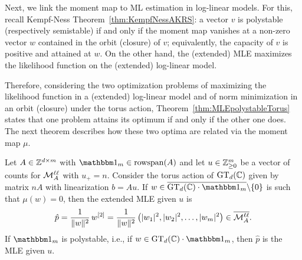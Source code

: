Next, we link the moment map to ML estimation in log-linear models. For this, recall Kempf-Ness Theorem~\ref{thm:KempfNessAKRS}: a vector $v$ is polystable (respectively semistable) if and only if the moment map vanishes at a non-zero vector $w$ contained in the orbit (closure) of $v$; equivalently, the capacity of $v$ is positive and attained at $w$. 
On the other hand, the (extended) MLE maximizes the likelihood function on the (extended) log-linear model.

Therefore, considering the two optimization problems of maximizing the likelihood function in a (extended) log-linear model and of norm minimization in an orbit (closure) under the torus action, Theorem~\ref{thm:MLEpolystableTorus} states that one problem attains its optimum if and only if the other one does.
The next theorem describes how these two optima are related via the moment map $\mu$. 

\begin{theorem}
	\label{thm:MLEviaMomentMapLogLinear} %
	Let $A \in \mathbb Z^{d \times m}$ with $\ones_m \in \rsp(A)$ and let $u \in \mathbb Z_{\geq 0}^m$ be a vector of counts for $\mathcal{M}^{\mathtt{\ell \ell}}_A$ with $u_+ = n$.
	Consider the torus action of $\operatorname{GT}_d(\mathbb C)$ given by matrix $n A$ with linearization $b = Au$. If $w \in \overline{\GT_d(\CC) \cdot \ones_m} \backslash \{0\}$ is such that $\mu(w) = 0$, then the extended MLE given $u$ is
		\begin{equation}\label{eq:orbitMLE} 
			\hat{p} = \frac{1}{\|w\|^2} \, w^{[2]} = \frac{1}{\|w\|^2} \left( |w_1|^2, |w_2|^2, \ldots, |w_m|^2 \right) \in \overline{\mathcal{M}^{\mathtt{\ell \ell}}_A}.
		\end{equation}
	If $\ones_m$ is polystable, i.e., if $w \in \GT_d(\CC) \cdot \ones_m$, then $\hat{p}$ is the MLE given $u$.
\end{theorem}

